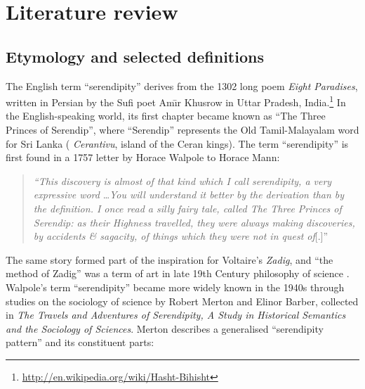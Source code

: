 
\section{Literature review} \label{sec:literature-review}

\subsection{Etymology and selected definitions} \label{sec:overview-serendipity}  
The English term ``serendipity'' derives from the 1302 long poem \emph{Eight Paradises}, written in Persian by the Sufi poet Am\={\i}r Khusrow in Uttar Pradesh, India.\footnote{\url{http://en.wikipedia.org/wiki/Hasht-Bihisht}}  In the English-speaking world, its first chapter became known as ``The Three Princes of Serendip'', where ``Serendip'' represents the Old Tamil-Malayalam word for Sri Lanka (%
\emph{Cerantivu}, island of the Ceran kings).
%
The term ``serendipity'' is first found in a 1757 letter by Horace Walpole to Horace Mann:
\begin{quote}
\emph{``This discovery is almost of that kind which I call serendipity, a very expressive
word} \ldots \emph{You will understand it better by the derivation than by the
definition. I once read a silly fairy tale, called The Three Princes of Serendip:
as their Highness travelled, they were always making discoveries, by accidents
\& sagacity, of things which they were not in quest of}[.]''~\cite[p. 633]{van1994anatomy}
\end{quote}
The same story formed part of the inspiration for Voltaire's \emph{Zadig}, and ``the method of Zadig'' was a term of art in late 19th Century philosophy of science \cite{huxley1894science}.
Walpole's term ``serendipity'' became more widely known in the 1940s through studies on the sociology of science by Robert Merton and Elinor Barber, collected in \emph{The Travels and Adventures of Serendipity, A Study in Historical Semantics and the Sociology of Sciences}.  Merton \citeyear{merton1948bearing} \cite<summarised in>[pp. 195--196]{merton} describes a generalised ``serendipity pattern'' and its constituent parts:

